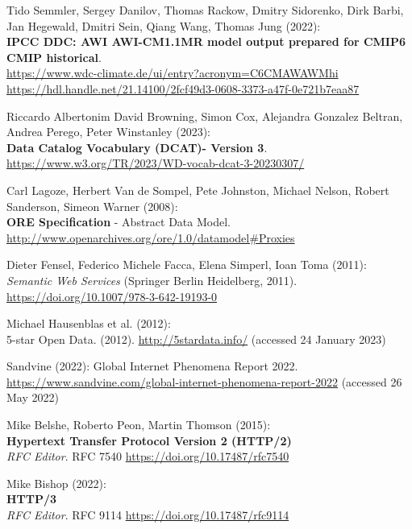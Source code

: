 \begin{thebibliography}{9}
Tido Semmler, Sergey Danilov, Thomas Rackow, Dmitry Sidorenko, Dirk
Barbi, Jan Hegewald, Dmitri Sein, Qiang Wang, Thomas Jung (2022):\\
\textbf{IPCC DDC: AWI AWI-CM1.1MR model output prepared for CMIP6 CMIP
historical}. \\
\url{https://www.wdc-climate.de/ui/entry?acronym=C6CMAWAWMhi}\\
\url{https://hdl.handle.net/21.14100/2fcf49d3-0608-3373-a47f-0e721b7eaa87}

Riccardo Albertonim David Browning, Simon Cox, Alejandra Gonzalez Beltran, Andrea Perego, Peter Winstanley (2023): \\
\textbf{Data Catalog Vocabulary (DCAT)- Version 3}.\\
\url{https://www.w3.org/TR/2023/WD-vocab-dcat-3-20230307/}


Carl Lagoze, 
Herbert Van de Sompel, 
Pete Johnston, 
Michael Nelson, 
Robert Sanderson, 
Simeon Warner (2008):\\
\textbf{ORE Specification} - {Abstract Data Model}. \\
\url{http://www.openarchives.org/ore/1.0/datamodel#Proxies} 

Dieter Fensel, Federico Michele Facca, Elena Simperl, Ioan Toma
(2011): \\
\emph{Semantic {Web Services}} ({Springer Berlin Heidelberg},
2011).
\url{https://doi.org/10.1007/978-3-642-19193-0}

Michael Hausenblas et al. (2012): \\
5-star {Open Data}. (2012).
\url{http://5stardata.info/} (accessed 24 January 2023)

Sandvine (2022): Global {Internet Phenomena Report} 2022.
\url{https://www.sandvine.com/global-internet-phenomena-report-2022}
(accessed 26 May 2022)

Mike Belshe, Roberto Peon, Martin Thomson (2015): \\
\textbf{Hypertext Transfer Protocol Version 2 (HTTP/2)} \\
\emph{RFC Editor}. RFC 7540
\url{https://doi.org/10.17487/rfc7540}

Mike Bishop (2022): \\
\textbf{{HTTP}/3}\\
\emph{RFC Editor}. RFC 9114
\url{https://doi.org/10.17487/rfc9114}


\end{thebibliography}
